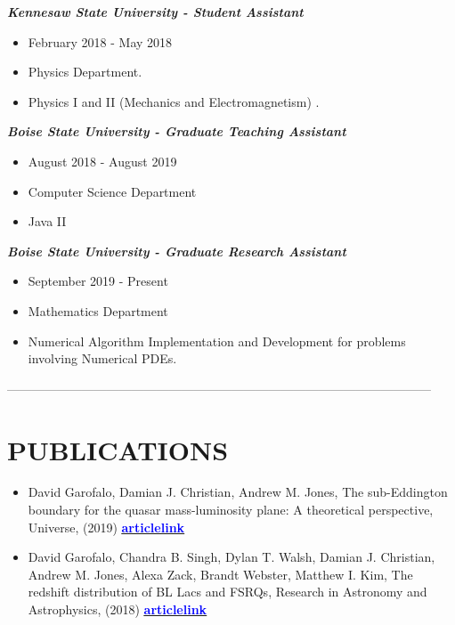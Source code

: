 \documentclass[margin, 10pt]{res} %
\begin{document}
\begin{resume}
{\sl \textbf{Kennesaw State University - Student Assistant}}  \\
\begin{itemize}
\item February 2018 - May 2018
\item Physics Department.
\item Physics I and II (Mechanics and Electromagnetism) .
\end{itemize}
 
{\sl \textbf{Boise State University - Graduate Teaching Assistant}} \\
\begin{itemize} 
\item August 2018 - August 2019
\item Computer Science Department
\item Java II
\end{itemize} 

{\sl \textbf{Boise State University - Graduate Research Assistant}} \\
\begin{itemize}
\item September 2019 - Present 
\item Mathematics Department
\item Numerical Algorithm Implementation and Development for problems involving Numerical PDEs.
\end{itemize} 


------------------------------------------------------------------------------------------------------

\section{PUBLICATIONS}

\begin{itemize}
\item David Garofalo, Damian J. Christian, Andrew M. Jones, The sub-Eddington boundary for the quasar mass-luminosity plane: A theoretical perspective, Universe, (2019) \href{https://www.mdpi.com/2218-1997/5/6/145}{\underline{\textcolor{blue}{\textbf{articlelink}}}}

\item David Garofalo, Chandra B. Singh, Dylan T. Walsh, Damian J. Christian, Andrew M. Jones, Alexa Zack, Brandt Webster, Matthew I. Kim, The redshift distribution of BL Lacs and FSRQs, Research in Astronomy and Astrophysics, (2018) \href{https://iopscience.iop.org/article/10.1088/1674-4527/19/1/13/meta}{\underline{\textcolor{blue}{\textbf{articlelink}}}}
\end{itemize}


\end{resume}
\end{document}
